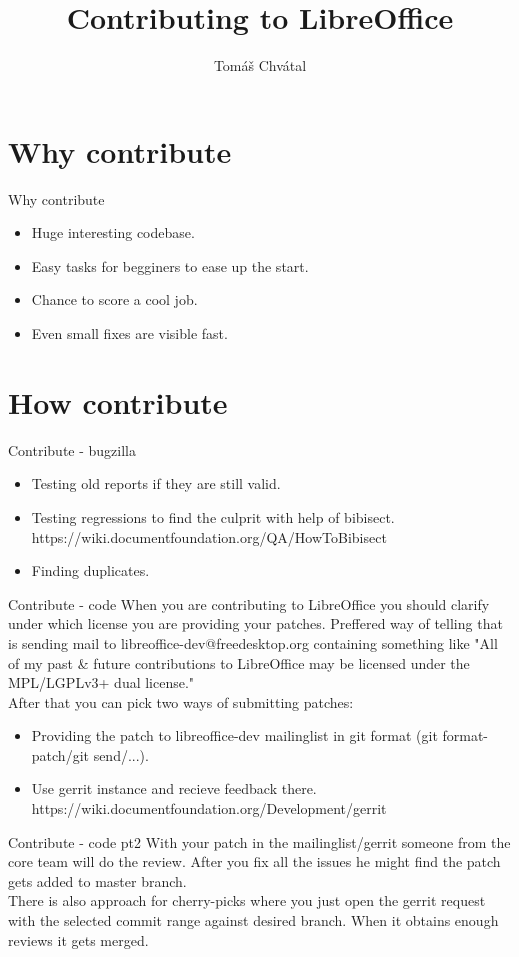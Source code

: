 \documentclass{beamer}
\author{Tom\'{a}\v{s} Chv\'{a}tal\newline {\small SUSE QA Maintenance}}
\title{Contributing to LibreOffice}
\begin{document}
\begin{frame}[t,plain]
\titlepage
\end{frame}

\section{Why contribute}

\begin{frame}{Why contribute}
	\begin{itemize}
	\item Huge interesting codebase.
	\item Easy tasks for begginers to ease up the start.
	\item Chance to score a cool job.
	\item Even small fixes are visible fast.
	\end{itemize}
\end{frame}

\section{How contribute}

\begin{frame}{Contribute - bugzilla}
	\begin{itemize}
	\item Testing old reports if they are still valid.
	\item Testing regressions to find the culprit with help of bibisect. https://wiki.documentfoundation.org/QA/HowToBibisect
	\item Finding duplicates.
	\end{itemize}
\end{frame}

\begin{frame}{Contribute - code}
	When you are contributing to LibreOffice you should clarify under which license you are providing your patches. Preffered
	way of telling that is sending mail to libreoffice-dev@freedesktop.org containing something like "All of my past \& future
	contributions to LibreOffice may be licensed under the MPL/LGPLv3+ dual license." \\
	After that you can pick two ways of submitting patches:
	\begin{itemize}
	\item Providing the patch to libreoffice-dev mailinglist in git format (git format-patch/git send/...).
	\item Use gerrit instance and recieve feedback there. https://wiki.documentfoundation.org/Development/gerrit
	\end{itemize}
\end{frame}
\begin{frame}{Contribute - code pt2}
	With your patch in the mailinglist/gerrit someone from the core team will do the review. After you fix all the issues
	he might find the patch gets added to master branch. \\
	There is also approach for cherry-picks where you just open the gerrit request with the selected commit range against
	desired branch. When it obtains enough reviews it gets merged.
\end{frame}
\end{document}
